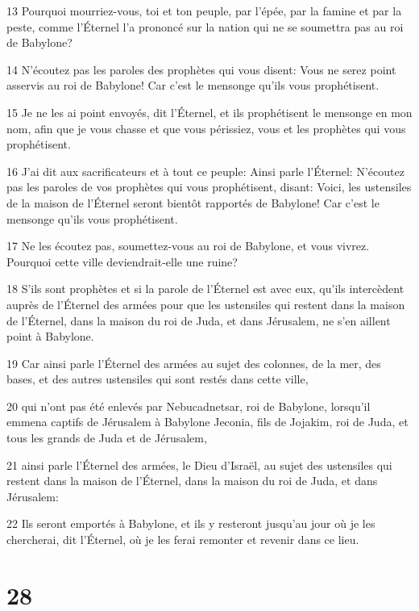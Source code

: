 \par 13 Pourquoi mourriez-vous, toi et ton peuple, par l'épée, par la famine et par la peste, comme l'Éternel l'a prononcé sur la nation qui ne se soumettra pas au roi de Babylone?
\par 14 N'écoutez pas les paroles des prophètes qui vous disent: Vous ne serez point asservis au roi de Babylone! Car c'est le mensonge qu'ils vous prophétisent.
\par 15 Je ne les ai point envoyés, dit l'Éternel, et ils prophétisent le mensonge en mon nom, afin que je vous chasse et que vous périssiez, vous et les prophètes qui vous prophétisent.
\par 16 J'ai dit aux sacrificateurs et à tout ce peuple: Ainsi parle l'Éternel: N'écoutez pas les paroles de vos prophètes qui vous prophétisent, disant: Voici, les ustensiles de la maison de l'Éternel seront bientôt rapportés de Babylone! Car c'est le mensonge qu'ils vous prophétisent.
\par 17 Ne les écoutez pas, soumettez-vous au roi de Babylone, et vous vivrez. Pourquoi cette ville deviendrait-elle une ruine?
\par 18 S'ils sont prophètes et si la parole de l'Éternel est avec eux, qu'ils intercèdent auprès de l'Éternel des armées pour que les ustensiles qui restent dans la maison de l'Éternel, dans la maison du roi de Juda, et dans Jérusalem, ne s'en aillent point à Babylone.
\par 19 Car ainsi parle l'Éternel des armées au sujet des colonnes, de la mer, des bases, et des autres ustensiles qui sont restés dans cette ville,
\par 20 qui n'ont pas été enlevés par Nebucadnetsar, roi de Babylone, lorsqu'il emmena captifs de Jérusalem à Babylone Jeconia, fils de Jojakim, roi de Juda, et tous les grands de Juda et de Jérusalem,
\par 21 ainsi parle l'Éternel des armées, le Dieu d'Israël, au sujet des ustensiles qui restent dans la maison de l'Éternel, dans la maison du roi de Juda, et dans Jérusalem:
\par 22 Ils seront emportés à Babylone, et ils y resteront jusqu'au jour où je les chercherai, dit l'Éternel, où je les ferai remonter et revenir dans ce lieu.

\chapter{28}

